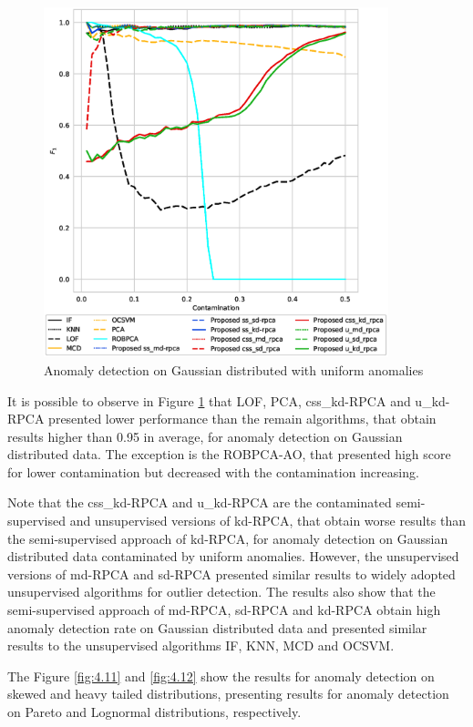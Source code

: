 \documentclass[review]{elsarticle}
\begin{document}
\begin{figure}[h!]
	\centering
	\includegraphics[width=10cm]{figures/gaussian_f1_contamination.eps}
	\caption{Anomaly detection on Gaussian distributed with uniform anomalies}
	\label{fig:4.10}
\end{figure}

It is possible to observe in Figure \ref{fig:4.10} that LOF, PCA, css\_kd-RPCA and u\_kd-RPCA presented lower performance than the remain algorithms, that obtain results higher than 0.95 in average, for anomaly detection on Gaussian distributed data. The exception is the ROBPCA-AO, that presented high score for lower contamination but decreased with the contamination increasing. 

Note that the css\_kd-RPCA and u\_kd-RPCA are the contaminated semi-supervised and unsupervised versions of kd-RPCA, that obtain worse results than the semi-supervised approach of kd-RPCA, for anomaly detection on Gaussian distributed data contaminated by uniform anomalies. However, the unsupervised versions of md-RPCA and sd-RPCA presented similar results to widely adopted unsupervised algorithms for outlier detection. The results also show that the semi-supervised approach of md-RPCA, sd-RPCA and kd-RPCA obtain high anomaly detection rate on Gaussian distributed data and presented similar results to the unsupervised algorithms IF, KNN, MCD and OCSVM. 

The Figure \ref{fig:4.11} and \ref{fig:4.12} show the results for anomaly detection on skewed and heavy tailed distributions, presenting results for anomaly detection on Pareto and Lognormal distributions, respectively.
\end{document}

